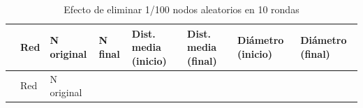 \documentclass[
  letterpaper,
  DIV=11,
  numbers=noendperiod]{scrreprt}
\begin{document}
\begin{tcolorbox}
\begin{longtable}[]{@{}
  >{\raggedright\arraybackslash}p{}
  >{\raggedright\arraybackslash}p{}
  >{\raggedleft\arraybackslash}p{}
  >{\raggedleft\arraybackslash}p{}
  >{\raggedleft\arraybackslash}p{}
  >{\raggedleft\arraybackslash}p{}
  >{\raggedleft\arraybackslash}p{}
  >{\raggedleft\arraybackslash}p{}@{}}
\caption{Efecto de eliminar 1/100 nodos aleatorios en 10
rondas}\tabularnewline
\toprule\noalign{}
\begin{minipage}[b]{\linewidth}\raggedright
\end{minipage} & \begin{minipage}[b]{\linewidth}\raggedright
Red
\end{minipage} & \begin{minipage}[b]{\linewidth}\raggedleft
N original
\end{minipage} & \begin{minipage}[b]{\linewidth}\raggedleft
N final
\end{minipage} & \begin{minipage}[b]{\linewidth}\raggedleft
Dist. media (inicio)
\end{minipage} & \begin{minipage}[b]{\linewidth}\raggedleft
Dist. media (final)
\end{minipage} & \begin{minipage}[b]{\linewidth}\raggedleft
Diámetro (inicio)
\end{minipage} & \begin{minipage}[b]{\linewidth}\raggedleft
Diámetro (final)
\end{minipage} \\
\midrule\noalign{}
\endfirsthead
\toprule\noalign{}
\begin{minipage}[b]{\linewidth}\raggedright
\end{minipage} & \begin{minipage}[b]{\linewidth}\raggedright
Red
\end{minipage} & \begin{minipage}[b]{\linewidth}\raggedleft
N original
\end{minipage} & \begin{minipage}[b]{\linewidth}\raggedleft

\end{minipage}
\end{longtable}
\end{tcolorbox}
\end{document}
